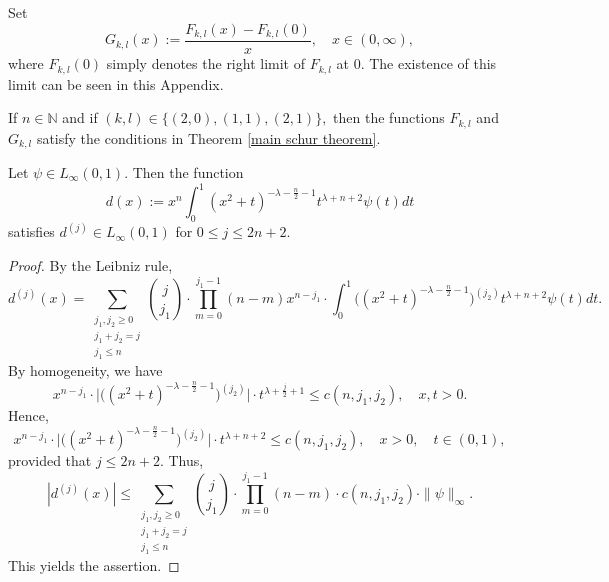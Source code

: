 \documentclass[12pt]{amsart}
\begin{document}
Set
$$G_{k,l}(x):=\frac{F_{k,l}(x)-F_{k,l}(0)}{x},\quad x\in(0,\infty),$$
where $F_{k,l}(0)$ {\color{blue}simply denotes} the right limit of $F_{k,l}$ at $0$. The existence of this limit can be seen in this Appendix.
\begin{theorem}\label{fkl are smooth theorem} If $n\in\mathbb{N}$ and if $(k,l)\in\{(2,0),(1,1),(2,1)\},$ then the functions $F_{k,l}$ and $G_{k,l}$ satisfy the conditions in Theorem \ref{main schur theorem}.
\end{theorem}

\begin{lemma}\label{first fkl lemma} Let $\psi\in L_{\infty}(0,1).$ Then the function
$$d(x):=x^n\int_0^1(x^2+t)^{-\lambda-\frac{n}{2}-1}t^{\lambda+n+2}\psi(t)dt$$
satisfies $d^{(j)}\in L_{\infty}(0,1)$ for $0\leq j\leq 2n+2.$
\end{lemma}
\begin{proof} {\color{blue}By the Leibniz rule,
$$d^{(j)}(x)=\sum_{\substack{j_1,j_2\geq0\\ j_1+j_2=j\\
j_1\leq n}}\binom{j}{j_1}\cdot\prod_{m=0}^{j_1-1}(n-m)x^{n-j_1}\cdot\int_0^1\big((x^2+t)^{-\lambda-\frac{n}{2}-1}\big)^{(j_2)}t^{\lambda+n+2}\psi(t)dt.$$
By homogeneity, we have
$$x^{n-j_1}\cdot\Big|\big((x^2+t)^{-\lambda-\frac{n}{2}-1}\big)^{(j_2)}\Big|\cdot t^{\lambda+\frac{j}{2}+1}\leq c(n,j_1,j_2),\quad x,t>0.$$
Hence,
$$x^{n-j_1}\cdot\Big|\big((x^2+t)^{-\lambda-\frac{n}{2}-1}\big)^{(j_2)}\Big|\cdot t^{\lambda+n+2}\leq c(n,j_1,j_2),\quad x>0,\quad t\in(0,1),$$
provided that $j\leq 2n+2.$ Thus,
$$|d^{(j)}(x)|\leq \sum_{\substack{j_1,j_2\geq0\\ j_1+j_2=j\\ j_1\leq n}}\binom{j}{j_1}\cdot\prod_{m=0}^{j_1-1}(n-m)\cdot c(n,j_1,j_2)\cdot \|\psi\|_{\infty}.$$}
This yields the assertion.
\end{proof}
\end{document}
